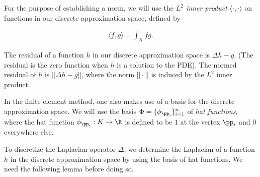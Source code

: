 For the purpose of establishing a norm, we will use the \textit{$L^2$ inner product} $\langle \cdot, \cdot \rangle$ on functions in our discrete approximation space, defined by

\begin{align*}
    \langle f, g \rangle = \int_K fg.
\end{align*}

The residual of a function $h$ in our discrete approximation space is $\Delta h - g$. (The residual is the zero function when $h$ is a solution to the PDE). The normed residual of $h$ is $||\Delta h - g||$, where the norm $||\cdot||$ is induced by the $L^2$ inner product.

In the finite element method, one also makes use of a basis for the discrete approximation space. We will use the basis $\Phi = \{\phi_{\pp_i}\}_{i = 1}^n$ of \textit{hat functions}, where the hat function $\phi_{\pp_i}:K \rightarrow \R$ is defined to be $1$ at the vertex $\pp_i$ and $0$ everywhere else. 


To discretize the Laplacian operator $\Delta$, we determine the Laplacian of a function $h$ in the discrete approximation space by using the basis of hat functions. We need the following lemma before doing so.

